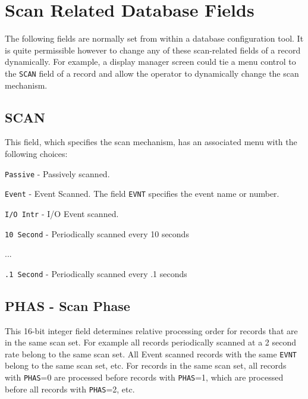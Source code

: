 \section{Scan Related Database Fields}

The following fields are normally set from within a database configuration tool.
It is quite permissible however to change any of these scan-related fields of a record dynamically.
For example, a display manager screen could tie a menu control to the \verb|SCAN| field of a record and allow the operator to dynamically change the scan mechanism.

\subsection{SCAN}

This field, which specifies the scan mechanism, has an associated menu with the following choices:

\begin{description}
\item \verb|Passive| - Passively scanned.

\item \verb|Event| - Event Scanned. The field \verb|EVNT| specifies the event name or number.

\item \verb|I/O Intr| - I/O Event scanned.

\item \verb|10 Second| - Periodically scanned every 10 seconds

\item ...

\item \verb|.1 Second| - Periodically scanned every .1 seconds

\end{description}

\subsection{PHAS - Scan Phase}

This 16-bit integer field determines relative processing order for records that are in the same scan set.
For example all records periodically scanned at a 2 second rate belong to the same scan set.
All Event scanned records with the same \verb|EVNT| belong to the same scan set, etc.
For records in the same scan set, all records with \verb|PHAS|=0 are processed before records with \verb|PHAS|=1, which are processed before all records with \verb|PHAS|=2, etc.

